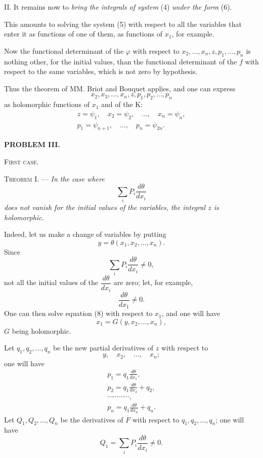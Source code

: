 \documentclass[11pt]{article}
\begin{document}
II. It remains now to \emph{bring the integrals of system} (4) \emph{under the form} (6).

This amounts to solving the system (5) with respect to all the variables that enter it as functions of one of them, as functions of $x_1$, for example.

Now the functional determinant of the $\varphi$ with respect to $x_2,\ldots,x_n,z,p_1,\ldots,p_n$ is nothing other, for the initial values, than the functional determinant of the $f$ with respect to the same variables, which is not zero by hypothesis.

Thus the theorem of MM. Briot and Bouquet applies, and one can express
\[x_2,x_3,\ldots,x_n,z,p_1,p_2,\ldots,p_n\]
as holomorphic functions of $x_1$ and of the K:
\begin{equation*}\tag{6}
\begin{gathered}
z=\psi_1,\quad x_2=\psi_2,\quad \ldots,\quad x_n=\psi_n,\\
p_1=\psi_{n+1},\quad \ldots,\quad p_n=\psi_{2n}.
\end{gathered}
\end{equation*}

\begin{center}
\textbf{PROBLEM III.}
\end{center}

\begin{center}
\textsc{First case.}
\end{center}

\noindent\textsc{Theorem I.} — \emph{In the case where}
\[
\sum_i P_i\frac{d\theta}{dx_i}
\]
\emph{does not vanish for the initial values of the variables, the integral $z$ is holomorphic.}

Indeed, let us make a change of variables by putting
\begin{equation*}\tag{8}
y=\theta(x_1,x_2,\ldots,x_n).
\end{equation*}
Since
\begin{equation*}\tag{9}
\sum_i P_i\frac{d\theta}{dx_i}\ne0,
\end{equation*}
not all the initial values of the $\dfrac{d\theta}{dx_i}$ are zero; let, for example,
\[
\frac{d\theta}{dx_1}\ne0.
\]
One can then solve equation (8) with respect to $x_1$, and one will have
\[
x_1=G(y,x_2,\ldots,x_n),
\]
$G$ being holomorphic.

Let $q_1,q_2,\ldots,q_n$ be the new partial derivatives of $z$ with respect to
\[
y,\quad x_2,\quad \ldots,\quad x_n;
\]
one will have
\[
\begin{gathered}
p_1=q_1\frac{d\theta}{dx_1},\\
p_2=q_1\frac{d\theta}{dx_2}+q_2,\\
\cdots\cdots\cdots\cdots,\\
p_n=q_1\frac{d\theta}{dx_n}+q_n.
\end{gathered}
\]
Let $Q_1,Q_2,\ldots,Q_n$ be the derivatives of $F$ with respect to $q_1,q_2,\ldots,q_n$; one will have
\[
Q_1=\sum_i P_i\frac{d\theta}{dx_i}\ne0.
\]
\end{document}
